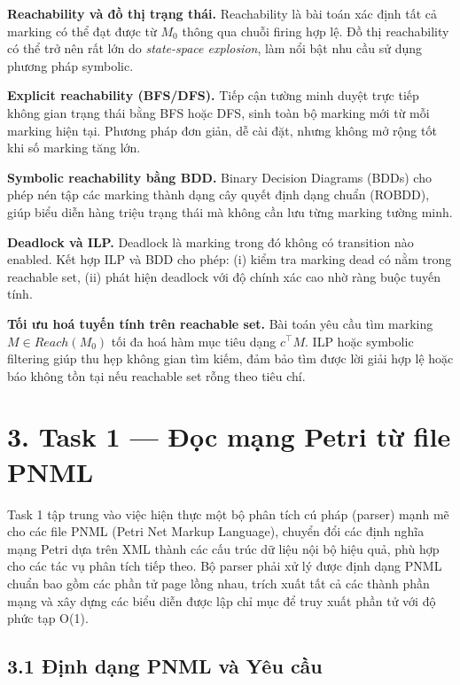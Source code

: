 \documentclass[12pt,a4paper]{article}
\begin{document}
\textbf{Reachability và đồ thị trạng thái.}
Reachability là bài toán xác định tất cả marking có thể đạt được từ $M_0$ thông qua chuỗi firing hợp lệ.
Đồ thị reachability có thể trở nên rất lớn do \textit{state-space explosion}, làm nổi bật nhu cầu sử dụng phương pháp symbolic.

\textbf{Explicit reachability (BFS/DFS).}
Tiếp cận tường minh duyệt trực tiếp không gian trạng thái bằng BFS hoặc DFS, sinh toàn bộ marking mới từ mỗi marking hiện tại.
Phương pháp đơn giản, dễ cài đặt, nhưng không mở rộng tốt khi số marking tăng lớn.

\textbf{Symbolic reachability bằng BDD.}
Binary Decision Diagrams (BDDs) cho phép nén tập các marking thành dạng cây quyết định dạng chuẩn (ROBDD), giúp biểu diễn hàng triệu trạng thái mà không cần lưu từng marking tường minh.

\textbf{Deadlock và ILP.}
Deadlock là marking trong đó không có transition nào enabled.
Kết hợp ILP và BDD cho phép: (i) kiểm tra marking dead có nằm trong reachable set, (ii) phát hiện deadlock với độ chính xác cao nhờ ràng buộc tuyến tính.

\textbf{Tối ưu hoá tuyến tính trên reachable set.}
Bài toán yêu cầu tìm marking $M \in Reach(M_0)$ tối đa hoá hàm mục tiêu dạng $c^\top M$.
ILP hoặc symbolic filtering giúp thu hẹp không gian tìm kiếm, đảm bảo tìm được lời giải hợp lệ hoặc báo không tồn tại nếu reachable set rỗng theo tiêu chí.

\section*{3. Task 1 --- Đọc mạng Petri từ file PNML}

Task 1 tập trung vào việc hiện thực một bộ phân tích cú pháp (parser) mạnh mẽ cho các file PNML (Petri Net Markup Language), chuyển đổi các định nghĩa mạng Petri dựa trên XML thành các cấu trúc dữ liệu nội bộ hiệu quả, phù hợp cho các tác vụ phân tích tiếp theo. Bộ parser phải xử lý được định dạng PNML chuẩn bao gồm các phần tử page lồng nhau, trích xuất tất cả các thành phần mạng và xây dựng các biểu diễn được lập chỉ mục để truy xuất phần tử với độ phức tạp O(1).

\subsection*{3.1 Định dạng PNML và Yêu cầu}
\end{document}

